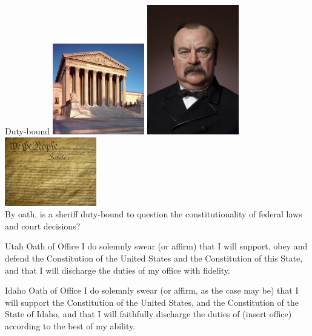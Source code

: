 \begin{frame}{Duty-bound}
    \centering
    \includegraphics[width=0.3\textwidth]{img/court-bldg.png}
    \includegraphics[width=0.3\textwidth]{img/cleveland.png}
    \includegraphics[width=0.3\textwidth]{img/constitution.png} \\
    \vspace{18pt}
    By oath, is a sheriff duty-bound to question the constitutionality of federal laws and court decisions? \\
\end{frame}

\begin{frame}
    \begin{block}{Utah Oath of Office}
    I do solemnly swear (or affirm) that I will support, obey and defend the Constitution of the United States and the Constitution of this State, and that I will discharge the duties of my office with fidelity.
    \end{block}
\end{frame}

\begin{frame}
    \begin{block}{Idaho Oath of Office}
    I do solemnly swear (or affirm, as the case may be) that I will support the Constitution of the United States, and the Constitution of the State of Idaho, and that I will faithfully discharge the duties of (insert office) according to the best of my ability.
    \end{block}
\end{frame}

